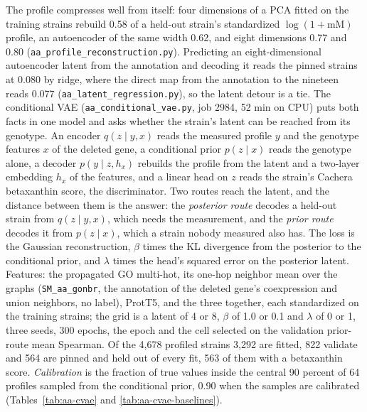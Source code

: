 The profile compresses well from itself: four dimensions of a PCA fitted on the training
strains rebuild 0.58 of a held-out strain's standardized $\log(1 + \text{mM})$ profile,
an autoencoder of the same width 0.62, and eight dimensions 0.77 and 0.80
(\texttt{aa\_profile\_reconstruction.py}). Predicting an eight-dimensional autoencoder
latent from the annotation and decoding it reads the pinned strains at 0.080 by ridge,
where the direct map from the annotation to the nineteen reads 0.077
(\texttt{aa\_latent\_regression.py}), so the latent detour is a tie. The conditional
VAE (\texttt{aa\_conditional\_vae.py}, job 2984, 52 min on CPU) puts both facts in one
model and asks whether the strain's latent can be reached from its genotype. An encoder
$q(z \mid y, x)$ reads the measured profile $y$ and the genotype features $x$ of the
deleted gene, a conditional prior $p(z \mid x)$ reads the genotype alone, a decoder
$p(y \mid z, h_x)$ rebuilds the profile from the latent and a two-layer embedding $h_x$
of the features, and a linear head on $z$ reads the strain's Cachera betaxanthin score,
the discriminator. Two routes reach the latent, and the distance between them is the
answer: the \emph{posterior route} decodes a held-out strain from $q(z \mid y, x)$, which
needs the measurement, and the \emph{prior route} decodes it from $p(z \mid x)$, which a
strain nobody measured also has. The loss is the Gaussian reconstruction, $\beta$ times
the KL divergence from the posterior to the conditional prior, and $\lambda$ times the
head's squared error on the posterior latent. Features: the propagated GO multi-hot, its
one-hop neighbor mean over the graphs (\texttt{SM\_aa\_gonbr}, the annotation of the
deleted gene's coexpression and union neighbors, no label), ProtT5, and the three
together, each standardized on the training strains; the grid is a latent of 4 or 8,
$\beta$ of 1.0 or 0.1 and $\lambda$ of 0 or 1, three seeds, 300 epochs, the epoch and
the cell selected on the validation prior-route mean Spearman. Of the 4,678 profiled
strains 3,292 are fitted, 822 validate and 564 are pinned and held out of every fit, 563
of them with a betaxanthin score. \emph{Calibration} is the fraction of true values
inside the central 90 percent of 64 profiles sampled from the conditional prior, 0.90
when the samples are calibrated (Tables~\ref{tab:aa-cvae} and
\ref{tab:aa-cvae-baselines}).

